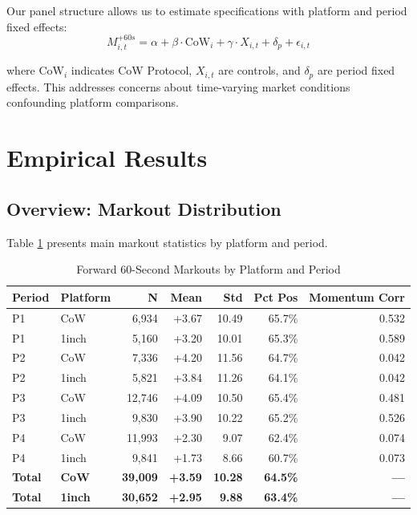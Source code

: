 \documentclass[12pt,a4paper]{article}
\begin{document}
Our panel structure allows us to estimate specifications with platform and period fixed effects:
\begin{equation}
M_{i,t}^{+60s} = \alpha + \beta \cdot \text{CoW}_i + \gamma \cdot X_{i,t} + \delta_p + \epsilon_{i,t}
\end{equation}

where $\text{CoW}_i$ indicates CoW Protocol, $X_{i,t}$ are controls, and $\delta_p$ are period fixed effects. This addresses concerns about time-varying market conditions confounding platform comparisons.

\section{Empirical Results}

\subsection{Overview: Markout Distribution}

Table \ref{tab:main_markouts} presents main markout statistics by platform and period.

\begin{table}[H]
\centering
\caption{Forward 60-Second Markouts by Platform and Period}
\label{tab:main_markouts}
\begin{tabular}{llrrrrr}
\toprule
\textbf{Period} & \textbf{Platform} & \textbf{N} & \textbf{Mean} & \textbf{Std} & \textbf{Pct Pos} & \textbf{Momentum Corr} \\
\midrule
P1 & CoW & 6,934 & +3.67 & 10.49 & 65.7\% & 0.532 \\
P1 & 1inch & 5,160 & +3.20 & 10.01 & 65.3\% & 0.589 \\
P2 & CoW & 7,336 & +4.20 & 11.56 & 64.7\% & 0.042 \\
P2 & 1inch & 5,821 & +3.84 & 11.26 & 64.1\% & 0.042 \\
P3 & CoW & 12,746 & +4.09 & 10.50 & 65.4\% & 0.481 \\
P3 & 1inch & 9,830 & +3.90 & 10.22 & 65.2\% & 0.526 \\
P4 & CoW & 11,993 & +2.30 & 9.07 & 62.4\% & 0.074 \\
P4 & 1inch & 9,841 & +1.73 & 8.66 & 60.7\% & 0.073 \\
\midrule
\textbf{Total} & \textbf{CoW} & \textbf{39,009} & \textbf{+3.59} & \textbf{10.28} & \textbf{64.5\%} & \textbf{---} \\
\textbf{Total} & \textbf{1inch} & \textbf{30,652} & \textbf{+2.95} & \textbf{9.88} & \textbf{63.4\%} & \textbf{---} \\
\bottomrule
\end{tabular}
\end{table}
\end{document}
